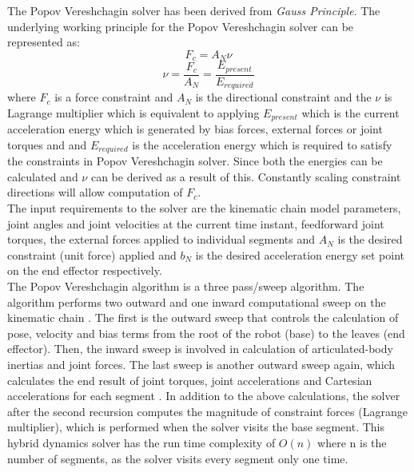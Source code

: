 The Popov Vereshchagin solver has been derived from \textit{Gauss Principle}. The underlying working principle for the Popov Vereshchagin solver can be represented as:
\begin{equation}
F_{c} = A_{N}\nu
\end{equation}
$$ \nu = \frac{F_{c}}{A_{N}} =  \frac{E_{present}}{E_{required}}$$ 
where $F_{c}$ is a force constraint and $A_{N}$ is the directional constraint and the $\nu$ is Lagrange multiplier which is equivalent to applying $E_{present}$ which is the current acceleration energy which is generated by bias forces, external forces or joint torques and and $E_{required}$ is the acceleration energy which is required to satisfy the constraints in Popov Vereshchagin solver. Since both the energies can be calculated and $\nu$ can be derived as a result of this. Constantly scaling constraint directions will allow computation of $F_{c}$.\\
\indent
The input requirements to the solver are the kinematic chain model parameters, joint angles and joint velocities at the current time instant, feedforward joint torques, the external forces applied to individual segments and $A_{N}$ is the desired constraint (unit force) applied and $b_{N}$ is the desired acceleration energy set point on the end effector respectively. \\
\indent
The Popov Vereshchagin algorithm is a three pass/sweep algorithm. The algorithm performs two outward and one inward computational sweep on the kinematic chain \cite{shakhimardanov2015composable}. The first is the outward sweep that controls the calculation of pose, velocity and bias terms from the root of the robot (base) to the leaves (end effector). Then, the inward sweep is involved in calculation of articulated-body inertias and joint forces. The last sweep is another outward sweep again, which calculates the end result of joint torques, joint accelerations and Cartesian accelerations for each segment \cite{shakhimardanov2015composable}. In addition to the above calculations, the solver after the second recursion computes the magnitude of constraint forces (Lagrange multiplier), which is performed when the solver visits the base segment. This hybrid dynamics solver has the run time complexity of $O(n)$ where n is the number of segments, as the solver visits every segment only one time. 
\\
